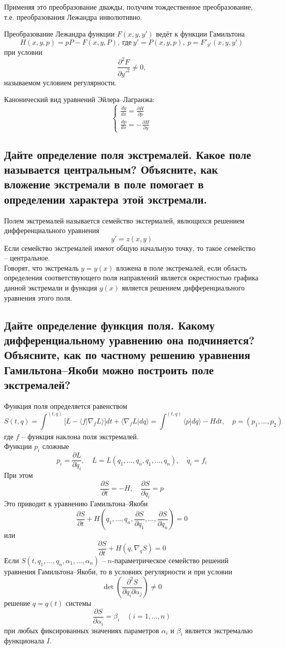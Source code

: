 \documentclass{article}
\begin{document}
Применяя это преобразование дважды, получим тождественное преобразование, т.е. преобразования Лежандра инволютивно.

Преобразование Лежандра функции $ F(x, y, y') $ ведёт к функции Гамильтона
\[ H(x, y, p) = pP-F(x,y,P),\: \text{где} \: y'=P(x, y, p), \:  p=F'_{y'}(x, y, y') \]
при условии \[ \frac{\partial^2 F}{\partial y'^2} \neq 0, \]
называемом условием регулярности.

Канонический вид уравнений Эйлера--Лагранжа:
\[\left\{
\begin{matrix}
	\frac{d y}{d x}=\frac{\partial H}{\partial p}\\ 
	\frac{d p}{d x}=-\frac{\partial H}{\partial y}
\end{matrix}
\right.\]


\subsection{Дайте определение поля экстремалей. Какое поле называется центральным? Объясните, как вложение экстремали в поле помогает в определении характера этой экстремали.}

Полем экстремалей называется семейство экстермалей, явлющихся решением дифференциального уравнения 
\[ y'=z(x,y) \]
Если семейство экстремалей имеют общую начальную точку, то такое семейство -- центральное.\\
Говорят, что экстремаль $y=y(x)$ вложена в поле экстремалей, если область определения соответствующего поля направлений является окрестностью графика данной экстремали и функция $y(x)$ является решением дифференциального уравнения этого поля. \\
\subsection{Дайте определение функция поля. Какому дифференциальному уравнению она подчиняется? Объясните, как по частному решению уравнения Гамильтона--Якоби можно построить поле экстремалей?}
Функция поля определяется равенством \[S(t,q)=\int_{}^{(t,q)}[L-\langle f |\nabla_f L\rangle ]dt + \langle \nabla_f L |dq\rangle = \int_{}^{(t,q)} \langle p|dq\rangle - Hdt, \quad p = (p_1,\dots, p_2)\]
где $f$ -- функция наклона поля экстремалей. \\
Функции $p_i$ сложные
\[p_i=\frac{\partial L}{\partial\dot q_i}, \quad L=L(q_1,\dots,q_n, \dot q_1,\dots,\dot q_n), \quad \dot q_i=f_i\]
При этом \[\frac{\partial S}{\partial t} = -H, \quad \frac{\partial S}{\partial q_i} = p\]
Это приводит к уравнению Гамильтона--Якоби \[\frac{\partial S}{\partial t}+H\left(q_1,\dots,q_n,\frac{\partial S}{\partial q_1},\dots,\frac{\partial S}{\partial q_n}\right)=0\] 
или \[\frac{\partial S}{\partial t}+H(q,\nabla_qS)=0\]
Если $S(t,q_1,\dots,q_n,\alpha_1,\dots,\alpha_n)$ -- $n$-параметрическое семейство решений уравнения Гамильтона--Якоби, то в условиях регулярности и при условии 	\[\det \left( \frac{\partial^2 S}{\partial q_i\partial\alpha_j}\right)\neq0\]
решение $q=q(t)$ системы \[\frac{\partial S}{\partial\alpha_i}=\beta_i\quad(i=1,\dots,n)\] 
при любых фиксированных значениях параметров $\alpha_i$ и $\beta_i$ является экстремалью функционала $I$.
\end{document}

